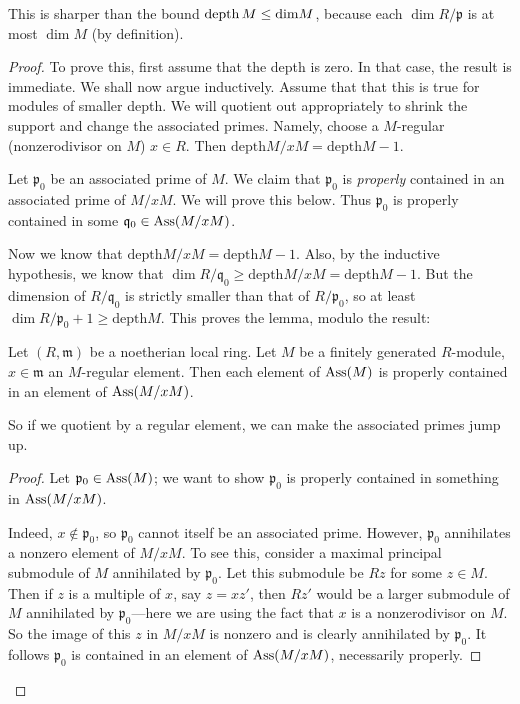 This is sharper than the bound $\operatorname{depth} M \leq \mathrm{dim} M$, because each $\dim
R/\mathfrak{p}$ is at most $\dim M$ (by definition).
\begin{proof}
To prove this, first assume that the depth is zero. In that case, the result is
immediate. We shall now argue inductively.
Assume that that this is true for modules of smaller depth. 
We will quotient out appropriately to shrink the
support and change the associated 
primes. Namely, choose a $M$-regular (nonzerodivisor on $M$) $x \in R$. 
Then $\mathrm{depth} M/xM = \mathrm{depth} M -1$. 

Let $\mathfrak{p}_0$ be an associated prime of $M$.
We  claim that $\mathfrak{p}_0$ is \emph{properly} contained in an associated prime of
$M/xM$. 
We will prove this below.
Thus $\mathfrak{p}_0$ is properly contained in some $\mathfrak{q}_0 \in
\operatorname{Ass}(M/xM)$.

Now we know that $\mathrm{depth} M/xM = \mathrm{depth} M -1$. Also, by the inductive
hypothesis, we know that $\dim R/\mathfrak{q}_0 \geq \mathrm{depth} M/xM = \mathrm{depth} M
-1$. But the dimension of $R/\mathfrak{q}_0$ is strictly smaller than that of
$R/\mathfrak{p}_0$, so at least $\dim R/\mathfrak{p}_0 +1 \geq \mathrm{depth} M$. This
proves the lemma, modulo the result:

\begin{lemma} \label{screwylemmaonquotientassprime} 
Let $(R, \mathfrak{m})$ be a noetherian local ring. Let $M$ be a finitely
generated $R$-module, $x \in \mathfrak{m}$ an $M$-regular element.
Then each element of $\operatorname{Ass}(M)$ is properly contained in an element of
$\operatorname{Ass}(M/xM)$.
\end{lemma} 
So if we quotient by a regular element, we can make the associated primes jump
up.
\begin{proof} Let $\mathfrak{p}_0 \in \operatorname{Ass}(M)$; we want to show
$\mathfrak{p}_0$ is properly contained in something in $\operatorname{Ass}(M/xM)$.

Indeed, $x \notin \mathfrak{p}_0$, so $\mathfrak{p}_0$ cannot itself be
an associated prime. 
However, $\mathfrak{p}_0$ annihilates a nonzero element of $M/xM$. To see this,
consider a maximal principal submodule of $M$ annihilated by $\mathfrak{p}_0$.
Let this submodule be $Rz$ for some $z \in M$. Then if $z$ is a multiple of
$x$, say $z = xz'$, then $Rz'$ would be a larger
submodule of $M$ annihilated by $\mathfrak{p}_0$---here we are using the fact
that $x$ is a nonzerodivisor on $M$. So the image of this $z$ in $M/xM$ is
nonzero and is clearly annihilated by $\mathfrak{p}_0$. 
It follows $\mathfrak{p}_0$ is contained in an element of
$\operatorname{Ass}(M/xM)$, necessarily properly.
\end{proof}

\end{proof} 
